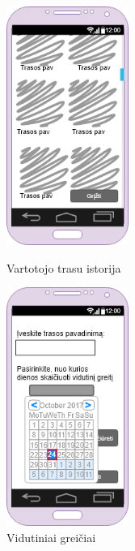 \documentclass[oneside]{VUMIFPSkursinis}
\begin{document}
\begin{figure}[h]
\centering
\parbox{5cm}{
\includegraphics[width=4cm]{ManoTrasuIstorija.png}
\caption{Vartotojo trasu istorija}
\label{fig:2figsA}}
\qquad
\begin{minipage}{5cm}
\includegraphics[width=4cm]{VidutiniaiGreičiai.png}
\caption{Vidutiniai greičiai}
\label{fig:2figsB}
\end{minipage}
\end{figure}
\end{document}
